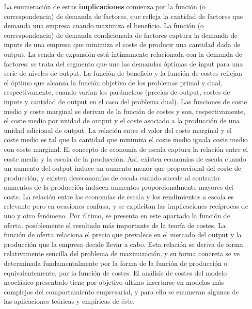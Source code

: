\documentclass{nuevotema}
\begin{document}
La enumeración de estas \textbf{implicaciones} comienza por la función (o correspondencia) de demanda de factores, que refleja la cantidad de factores que demanda una empresa cuando maximiza el beneficio. La función (o correspondencia) de demanda condicionada de factores captura la demanda de inputs de una empresa que minimiza el coste de producir una cantidad dada de output. La senda de expansión está íntimamente relacionada con la demanda de factores: se trata del segmento que une las demandas óptimas de input para una serie de niveles de output. La función de beneficio y la función de costes reflejan el óptimo que alcanza la función objetivo de los problemas primal y dual, respectivamente, cuando varían los parámetros (precios de output, costes de inputs y cantidad de output en el caso del problema dual). Las funciones de coste medio y coste marginal se derivan de la función de costes y son, respectivamente, el coste medio por unidad de output y el coste asociado a la producción de una unidad adicional de output. La relación entre el valor del coste marginal y el coste medio es tal que la cantidad que minimiza el coste medio iguala coste medio con coste marginal. El concepto de economía de escala captura la relación entre el coste medio y la escala de la producción. Así, existen economías de escala cuando un aumento del output induce un aumento menor que proporcional del coste de producción, y existen deseconomías de escala cuando sucede al contrario: aumentos de la producción inducen aumentos proporcionalmente mayores del coste. La relación entre las economías de escala y los rendimientos a escala es relevante pero en ocasiones confusa, y se explicitan las implicaciones recíprocas de uno y otro fenómeno. Por último, se presenta en este apartado la función de oferta, posiblemente el resultado más importante de la teoría de costes. La función de oferta relaciona el precio que prevalece en el mercado del output y la producción que la empresa decide llevar a cabo. Esta relación se deriva de forma relativamente sencilla del problema de maximización, y su forma concreta se ve determinada fundamentalmente por la forma de la función de producción o equivalentemente, por la función de costes. El análisis de costes del modelo neoclásico presentado tiene por objetivo ultimo insertarse en modelos más complejos del comportamiento empresarial, y para ello se enumeran algunas de las aplicaciones teóricas y empíricas de éste.
\end{document}
